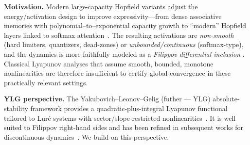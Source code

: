 \documentclass[journal]{IEEEtran}
\theoremstyle{myplain}
\begin{document}
\textbf{Motivation.} Modern large-capacity Hopfield variants adjust the energy/activation design to
improve expressivity---from dense associative memories with polynomial--to--exponential capacity growth
\cite{krotovHopfield2016,demircigil2017} to ``modern'' Hopfield layers
linked to softmax attention~\cite{ramsauer2020}. The resulting activations are
\emph{non-smooth} (hard limiters, quantizers, dead-zones) or \emph{unbounded/continuous} (softmax-type),
and the dynamics is more faithfully modeled as a \emph{Filippov differential inclusion} \cite{Filippov1988}.
Classical Lyapunov analyses that assume smooth, bounded, monotone nonlinearities are therefore
insufficient to certify global convergence in these practically relevant settings.


\textbf{YLG perspective.}
The Yakubovich--Leonov--Gelig (futher --- YLG) absolute-stability framework provides a quadratic-plus-integral
Lyapunov functional tailored to Lur\'e systems with sector/slope-restricted nonlinearities~\cite{YLG}.
It is well suited to Filippov right-hand sides and has been refined in subsequent works for
discontinuous dynamics~\cite{Boikov2008,RajchakitAgarwalRamalingam2021}. We build on this perspective.
\end{document}
